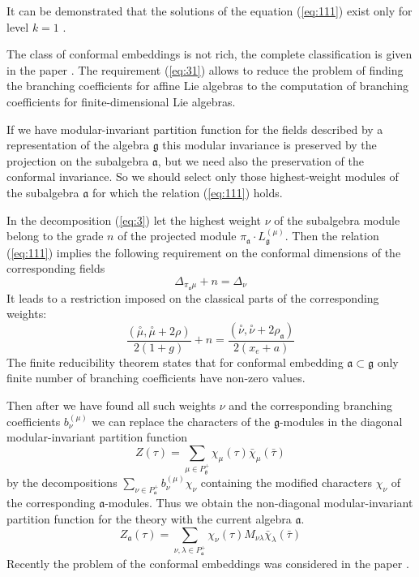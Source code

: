 \documentclass[a4paper,12pt]{article}
\theoremstyle{definition} \newtheorem{Def}{Definition}
\newcommand{\co}[1]{\overset{\circ }{#1}}
\begin{document}
It can be demonstrated that the solutions of the equation (\ref{eq:111}) exist only
for level $k=1$ \cite{difrancesco1997cft}.

The class of conformal embeddings is not rich, the complete classification is given in the paper \cite{schellekens1986conformal}.
The requirement (\ref{eq:31}) allows to reduce the problem of finding the branching coefficients for affine Lie algebras to the computation of branching coefficients for finite-dimensional Lie algebras.

If we have modular-invariant partition function for the fields described by a representation of the algebra $\mathfrak{g}$ this modular invariance is preserved by the projection on the subalgebra $\mathfrak{a}$, but we need also the preservation of the conformal invariance. So we should select only those highest-weight modules of the subalgebra $\mathfrak{a}$ for which the relation (\ref{eq:111}) holds.

In the decomposition (\ref{eq:3}) let the highest weight $\nu$ of the subalgebra module belong to the grade $n$ of the projected  module $\pi_{\mathfrak{a}}\cdot L^{(\mu)}_{\mathfrak{g}}$.  Then the relation (\ref{eq:111}) implies the following requirement on the conformal dimensions of the corresponding fields
\begin{equation}
  \label{eq:32}
   \Delta_{\pi_{\mathfrak{a}}\mu}+n=\Delta_{\nu}
\end{equation}
It leads to a restriction imposed on the classical parts of the corresponding weights:
\begin{equation}
  \label{eq:33}
  \frac{(\co{\mu},\co{\mu}+2\rho)}{2(1+g)}+n=\frac{(\co{\nu},\co{\nu}+2\rho_{\mathfrak{a}})}{2(x_e+a)}
\end{equation}
The finite reducibility theorem states that for conformal embedding  $\mathfrak{a}\subset\mathfrak{g}$ only finite number of branching coefficients have non-zero values.

Then after we have found all such weights $\nu$ and the corresponding branching coefficients $b^{(\mu)}_{\nu}$ we can replace the characters of the $\mathfrak{g}$-modules in the diagonal modular-invariant partition function
\begin{equation}
  \label{eq:34}
   Z(\tau)=\sum_{ \mu\in P^{+}_{\mathfrak{g}}} \chi_{\mu}(\tau)\bar \chi_{\mu}(\bar \tau)
\end{equation}
by the decompositions   $\sum_{\nu \in P^{+}_{\mathfrak{a}}}b^{(\mu)}_{\nu} \chi_{\nu}$ containing the modified characters $\chi_{\nu}$ of the corresponding $\mathfrak{a}$-modules. Thus we obtain the non-diagonal modular-invariant  partition function for the theory with the current algebra $\mathfrak{a}$.
\begin{equation}
  \label{eq:36}
   Z_{\mathfrak{a}}(\tau)=\sum_{ \nu,\lambda\in P^{+}_{\mathfrak{a}}} \chi_{\nu}(\tau)M_{\nu\lambda}\bar \chi_{\lambda}(\bar \tau)
\end{equation}
Recently the problem of the conformal embeddings was considered in the paper \cite{coquereaux2008conformal}.  
\end{document}
